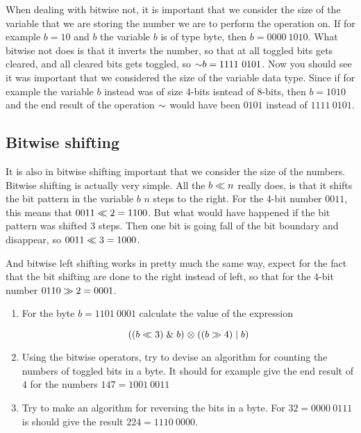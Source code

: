 When dealing with bitwise not, it is important that we consider the
size of the variable that we are storing the number we are to perform
the operation on. If for example $b=10$ and $b$ the variable $b$ is of
type byte, then $b=0000\ 1010$. What bitwise not does is that it
inverts the number, so that at all toggled bits gets cleared, and all
cleared bits gets toggled, so $\mathord{\sim} b = 1111\ 0101$. Now you should
see it was important that we considered the size of the variable data
type. Since if for example the variable $b$ instead was of size 4-bits
isntead of 8-bits, then $b = 1010$ and  the end result of the operation $\mathord{\sim}$
would have been $0101$ instead of $1111\ 0101$.

\subsection{Bitwise shifting}

It is also in bitwise shifting important that we consider the size of
the numbers. Bitwise shifting is actually very simple. All the $b
\ll n$ really does, is that it shifts the bit pattern in the
variable $b$ $n$ steps to the right. For the 4-bit number $0011$, this
means that $0011 \ll 2 = 1100$. But what would have happened if
the bit pattern was shifted 3 steps. Then one bit is going fall of the
bit boundary and disappear, so $0011 \ll 3 = 1000$.

And bitwise left shifting works in pretty much the same way, expect
for the fact that the bit shifting are done to the right instead of
left, so that for the 4-bit number $0110 \gg 2 = 0001$.

\begin{enumerate}
\item For the byte $b = 1101\ 0001$ calculate the value of the
  expression

  \begin{equation*}
    ((b \ll 3) \mathrel{\&} b) \mathrel{\otimes} ((b \gg 4) \mathrel{|} b)
  \end{equation*}

\item Using the bitwise operators, try to devise an algorithm for
  counting the numbers of toggled bits in a byte. It should for
  example give the end result of $4$ for the numbers $147 = 1001\
  0011$

\item Try to make an algorithm for reversing the bits in a byte. For
  $32=0000\ 0111$ is should give the result $224 = 1110\ 0000$.

\end{enumerate}

